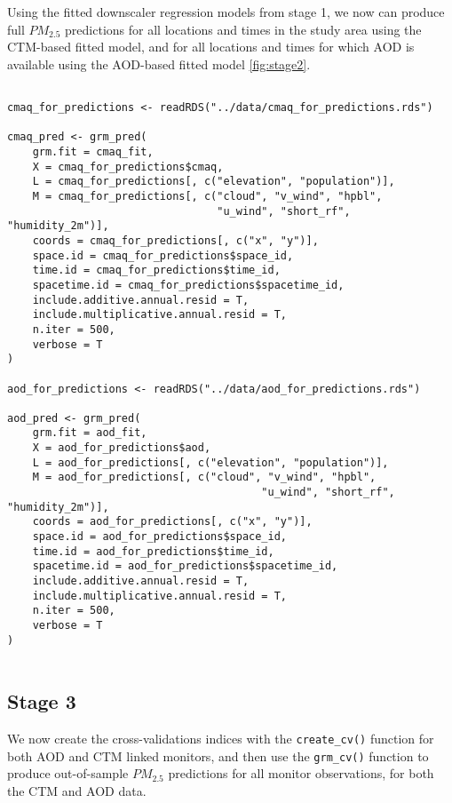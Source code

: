 Using the fitted downscaler regression models from stage 1, we now can produce full $PM_2.5$ predictions for all locations and times in the study area using the CTM-based fitted model, and for all locations and times for which AOD is available using the AOD-based fitted model \ref{fig:stage2}.



\begin{lstlisting}

cmaq_for_predictions <- readRDS("../data/cmaq_for_predictions.rds")

cmaq_pred <- grm_pred(
    grm.fit = cmaq_fit,
    X = cmaq_for_predictions$cmaq,
    L = cmaq_for_predictions[, c("elevation", "population")],
    M = cmaq_for_predictions[, c("cloud", "v_wind", "hpbl",
                                 "u_wind", "short_rf", "humidity_2m")],
    coords = cmaq_for_predictions[, c("x", "y")],
    space.id = cmaq_for_predictions$space_id,
    time.id = cmaq_for_predictions$time_id,
    spacetime.id = cmaq_for_predictions$spacetime_id,
    include.additive.annual.resid = T,
    include.multiplicative.annual.resid = T,
    n.iter = 500,
    verbose = T
)

aod_for_predictions <- readRDS("../data/aod_for_predictions.rds")

aod_pred <- grm_pred(
    grm.fit = aod_fit,
    X = aod_for_predictions$aod,
    L = aod_for_predictions[, c("elevation", "population")],
    M = aod_for_predictions[, c("cloud", "v_wind", "hpbl", 
                                        "u_wind", "short_rf", "humidity_2m")],
    coords = aod_for_predictions[, c("x", "y")],
    space.id = aod_for_predictions$space_id,
    time.id = aod_for_predictions$time_id,
    spacetime.id = aod_for_predictions$spacetime_id,
    include.additive.annual.resid = T,
    include.multiplicative.annual.resid = T,
    n.iter = 500,
    verbose = T
)


\end{lstlisting}


\subsection*{Stage 3}

We now create the cross-validations indices with the \texttt{create\_cv()} function for both AOD and CTM linked monitors, and then use the \texttt{grm\_cv()} function to produce out-of-sample $PM_{2.5}$ predictions for all monitor observations, for both the CTM and AOD data.

